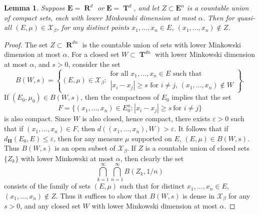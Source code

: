 \documentclass[12pt,reqno]{article}
\numberwithin{equation}{section}
\DeclareMathOperator{\RR}{\mathbf{R}}
\DeclareMathOperator{\TT}{\mathbf{T}}
\newtheorem{lemma}[theorem]{Lemma}
\numberwithin{theorem}{section}
\begin{document}
\begin{lemma} \label{LemmaVIVIJCIJSIJ}
    Suppose $\mathbf{E} = \RR^d$ or $\mathbf{E} = \TT^d$, and let $Z \subset \mathbf{E}^n$ is a countable union of compact sets, each with lower Minkowski dimension at most $\alpha$. Then for quasi-all $(E,\mu) \in \mathcal{X}_\beta$, for any distinct points $x_1, \dots, x_n \in E$, $(x_1, \dots, x_n) \not \in Z$.
\end{lemma}
\begin{proof}
    The set $Z \subset \RR^{dn}$ is the countable union of sets with lower Minkowski dimension at most $\alpha$. For a closed set $W \subset \TT^{dn}$ with lower Minkowski dimension at most $\alpha$, and $s > 0$, consider the set
    \[ B(W,s) = \left\{ (E,\mu) \in \mathcal{X}_\beta: \begin{array}{c}
            \text{for all $x_1, \dots, x_n \in E$ such that}\\
            \text{$|x_i - x_j| \geq s$ for $i \neq j$, $(x_1, \dots, x_n) \not \in W$}
        \end{array} \right\}. \]
    If $(E_0,\mu_0) \in B(W,s)$, then the compactness of $E_0$ implies that the set
    \[ F = \{ (x_1,\dots,x_n) \in E_0^n : |x_i - x_j| \geq s\ \text{for $i \neq j$} \} \]
    is also compact. Since $W$ is also closed, hence compact, there exists $\varepsilon > 0$ such that if $(x_1,\dots,x_n) \in F$, then $d((x_1,\dots,x_n),W) > \varepsilon$. It follows that if $d_\mathbf{H}(E_0,E) \leq \varepsilon$, then for any measure $\mu$ supported on $E$, $(E,\mu) \in B(W,s)$. Thus $B(W,s)$ is an open subset of $\mathcal{X}_\beta$. If $Z$ is a countable union of closed sets $\{ Z_k \}$ with lower Minkowski at most $\alpha$, then clearly the set
    \[ \bigcap_{k = 1}^\infty \bigcap_{n = 1}^\infty B(Z_k,1/n) \]
    consists of the family of sets $(E,\mu)$ such that for distinct $x_1, \dots, x_n \in E$, $(x_1, \dots, x_n) \not \in Z$. Thus it suffices to show that $B(W,s)$ is dense in $\mathcal{X}_\beta$ for any $s > 0$, and any closed set $W$ with lower Minkowski dimension at most $\alpha$.


\end{proof}
\end{document}
